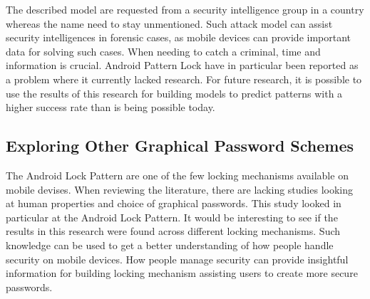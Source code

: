       The described model are requested from a security intelligence group in a country whereas the name need to stay unmentioned. Such attack model can assist security intelligences in forensic cases, as mobile devices can provide important data for solving such cases. When needing to catch a criminal, time and information is crucial. Android Pattern Lock have in particular been reported as a problem where it currently lacked research. For future research, it is possible to use the results of this research for building models to predict patterns with a higher success rate than is being possible today. 

    \subsection{Exploring Other Graphical Password Schemes}
      The Android Lock Pattern are one of the few locking mechanisms available on mobile devises. When reviewing the literature, there are lacking studies looking at human properties and choice of graphical passwords. This study looked in particular at the Android Lock Pattern. It would be interesting to see if the results in this research were found across different locking mechanisms. Such knowledge can be used to get a better understanding of how people handle security on mobile devices. How people manage security can provide insightful information for building locking mechanism assisting users to create more secure passwords.
    
